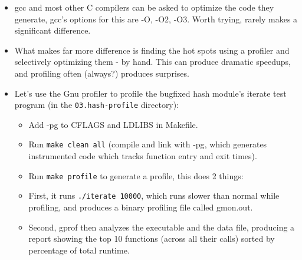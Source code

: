 \documentclass[aspectratio=169]{beamer}
\newcommand{\pitem}{\pause \item}
\begin{document}
\begin{frame}[fragile]
    \begin{itemize}
    \item
      \alert{gcc} and most other C compilers can be asked to
      \alert{optimize the code they generate}, gcc's options for this
      are \alert{-O, -O2, -O3}.
      Worth trying, rarely makes a significant difference.
    \pause
    \item
      What makes far more difference is finding the \alert{hot spots}
      using a \alert{profiler} and selectively optimizing them - by hand.
      This can produce dramatic speedups, and profiling often (always?)
      produces surprises.
    \pause
    \item
      Let's use the \alert{Gnu profiler} to profile the bugfixed hash
      module's \alert{iterate} test program
      (in the \verb+03.hash-profile+ directory):
      \begin{itemize}
      \item
        Add -pg to CFLAGS and LDLIBS in Makefile.
      \item
	Run \verb+make clean all+
	(compile and link with \alert{-pg}, which generates instrumented
        code which tracks function entry and exit times).
      \item
	Run \verb+make profile+ to generate a profile, this does 2 things:
      \pitem
	First, it runs \verb+./iterate 10000+, which runs slower than normal
  	while profiling, and produces a binary profiling file
	called \alert{gmon.out}.
      \item
        Second, \alert{gprof} then analyzes the executable and the
        data file, producing a report showing the top 10 functions
        (across all their calls) sorted by percentage of total runtime.
      \end{itemize}
    \end{itemize}
\end{frame}
\end{document}
